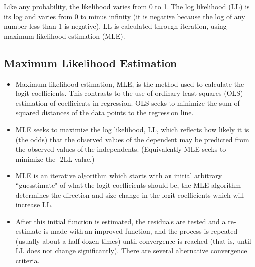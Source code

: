 ﻿\documentclass[a4paper,12pt]{article}
\begin{document}
Like any probability, the likelihood varies from 0 to 1. The log likelihood (LL) is its log and varies from 0 to minus infinity (it is negative because the log of any number less than 1 is negative). LL is calculated through iteration, using maximum likelihood estimation (MLE).


\subsection{Maximum Likelihood Estimation}
\begin{itemize}
	\item Maximum likelihood estimation, MLE, is the method used to calculate the logit coefficients. This contrasts to the use of ordinary least squares (OLS) estimation of coefficients in regression. OLS seeks to minimize the sum of squared distances of the data points to the regression line. 
	\item MLE seeks to maximize the log likelihood, LL, which reflects how likely it is (the odds) that the observed values of the dependent may be predicted from the observed values of the independents. (Equivalently MLE seeks to minimize the -2LL value.)
	
	\item MLE is an iterative algorithm which starts with an initial arbitrary ``guesstimate" of what the logit coefficients should be, the MLE algorithm determines the direction and size change in the logit coefficients which will increase LL. 
	\item After this initial function is estimated, the residuals are tested and a re-estimate is made with an improved function, and the process is repeated (usually about a half-dozen times) until convergence is reached (that is, until LL does not change significantly). There are several alternative convergence criteria.
\end{itemize}
\end{document}
